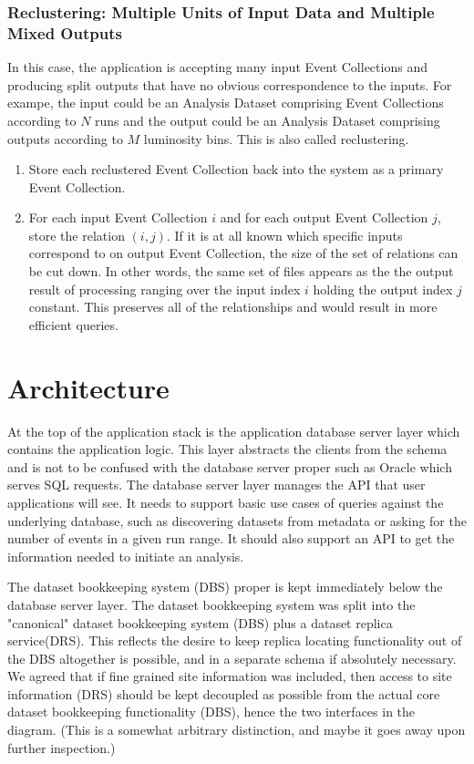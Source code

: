 \documentclass{cmspaper}
\begin{document}
\subsubsection{Reclustering: Multiple Units of Input Data and Multiple Mixed Outputs}

In this case, the application is accepting many input Event Collections
and producing split outputs that have no obvious correspondence to the 
inputs.  For exampe, the input could be 
an Analysis Dataset comprising Event Collections according to $N$ runs and the 
output could be an Analysis Dataset comprising outputs 
according to $M$ luminosity bins.  This is also called reclustering.
\begin{enumerate}
\item Store each reclustered Event Collection back into the system as a
primary Event Collection. 
\item For each input Event Collection $i$ and for each output Event Collection $j$,
store the relation $(i,j)$.  If it is at all known which specific inputs correspond to 
on output Event Collection,  the size of the set of relations can be cut down. 
In other words, the same set of 
files appears as the the output result of processing ranging over the input 
index $i$ holding the output index $j$ constant.  This 
preserves  all of the relationships and would 
result in more efficient queries.
\end{enumerate}



\section{Architecture}


At the top of the application stack is the application database server layer which contains
the application logic.  This layer abstracts the clients from the schema and is not 
to be confused with the database server proper such as Oracle which serves SQL requests.
The database server layer manages the API that user applications will see.  It needs to 
support basic use cases of queries against the underlying database, such as discovering 
datasets from metadata or asking for the number of events in a given run range.  It 
should also support an API to get the information needed to initiate an analysis.  

The dataset bookkeeping system (DBS) proper is kept immediately below the database 
server layer.  The dataset bookkeeping system was split into the "canonical" dataset 
bookkeeping system (DBS) plus a dataset replica service(DRS).  This reflects the 
desire to keep replica locating functionality out of the DBS altogether is possible, 
and in a separate schema if absolutely necessary.    We agreed that if fine grained 
site information was included, then access to site information (DRS) should be kept 
decoupled as possible from the actual core dataset bookkeeping functionality (DBS), 
hence the two interfaces in the diagram.  (This is a somewhat arbitrary distinction, 
and maybe it goes away upon further inspection.)
\end{document}

